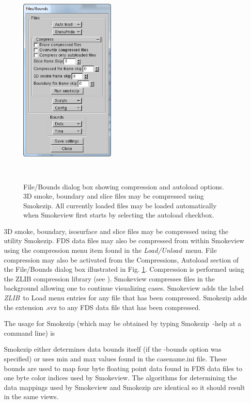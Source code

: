 \documentclass[11pt,twoside]{book}
\begin{document}
\begin{figure}[bph]
\centerline{\includegraphics[width=1.881944in]{FIGURES/figBOUNDcompress}\ }
\caption[Compress Files and Autoload dialog box.] {File/Bounds dialog
box showing compression and autoload options.  3D smoke,  boundary and slice
files may be compressed using Smokezip.  All currently loaded
files may be loaded automatically when Smokeview first starts by
selecting the autoload checkbox.}\ \label{figBOUNDScompress}
\end{figure}

3D smoke, boundary, isosurface and slice files may be compressed
using the utility Smokezip.  FDS data files may also be compressed
from within Smokeview using the compression menu item found in the
{\em Load/Unload}\ menu.  File compression may also be activated
from the Compressions, Autoload section of the File/Bounds
dialog box illustrated in Fig. \ref{figBOUNDScompress}.
Compression is performed using the ZLIB compression library (see
). Smokeview compresses files in the
background allowing one to continue visualizing cases.  Smokeview
adds the label {\em ZLIB}\ to Load menu entries for any file that
has been compressed. Smokezip adds the extension .svz to any FDS
data file that has been compressed.

The usage for Smokezip (which may be obtained by typing Smokezip~-help at a command line) is



Smokezip either determines data bounds itself (if the -bounds option was specified)
or uses min and max values found in the casename.ini
file.  These bounds are used to map four byte floating point data
found in FDS data files to one byte color indices used by
Smokeview.  The algorithms for determining
the data mappings used by Smokeview and Smokezip are identical so it
should result in the same views.
\end{document}
